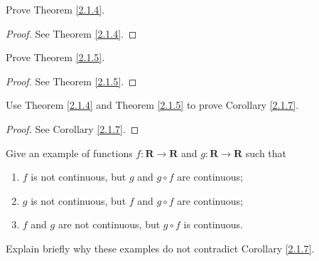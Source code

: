 \exercisesection

\begin{exercise}\label{ex 2.1.1}
    Prove Theorem \ref{2.1.4}.
\end{exercise}

\begin{proof}
    See Theorem \ref{2.1.4}.
\end{proof}

\begin{exercise}\label{ex 2.1.2}
    Prove Theorem \ref{2.1.5}.
\end{exercise}

\begin{proof}
    See Theorem \ref{2.1.5}.
\end{proof}

\begin{exercise}\label{ex 2.1.3}
    Use Theorem \ref{2.1.4} and Theorem \ref{2.1.5} to prove Corollary \ref{2.1.7}.
\end{exercise}

\begin{proof}
    See Corollary \ref{2.1.7}.
\end{proof}

\begin{exercise}\label{ex 2.1.4}
    Give an example of functions \(f : \mathbf{R} \to \mathbf{R}\) and \(g : \mathbf{R} \to \mathbf{R}\) such that
    \begin{enumerate}
        \item \(f\) is not continuous, but \(g\) and \(g \circ f\) are continuous;
        \item \(g\) is not continuous, but \(f\) and \(g \circ f\) are continuous;
        \item \(f\) and \(g\) are not continuous, but \(g \circ f\) is continuous.
    \end{enumerate}
    Explain briefly why these examples do not contradict Corollary \ref{2.1.7}.
\end{exercise}

